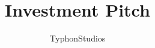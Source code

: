 \documentclass[11pt]{beamer}
\begin{document}
	\author{TyphonStudios}
	\title{Investment Pitch}
	\begin{frame}[plain]
	\end{frame}
	
	\begin{frame}
		\frametitle{}
	\end{frame}
\end{document}
